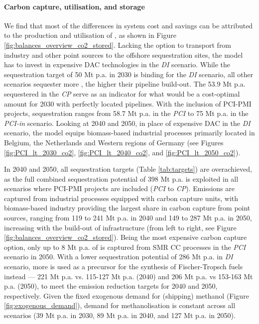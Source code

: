 \documentclass[preprint,12pt,sort&compress]{elsarticle}
\begin{document}
\paragraph{Carbon capture, utilisation, and storage}
\label{sec:ccus}
We find that most of the differences in system cost and savings can be attributed to the production and utilisation of , as shown in Figure \ref{fig:balances_overview_co2_stored}. Lacking the option to transport  from industry and other point sources to the offshore sequestration sites, the model has to invest in expensive DAC technologies in the \textit{DI} scenario. While the sequestration target of 50 Mt p.a. in 2030 is binding for the \textit{DI} scenario, all other scenarios sequester more , the higher their  pipeline build-out. The 53.9 Mt p.a.  sequestered in the \textit{CP} serve as an indicator for what would be a cost-optimal amount for 2030 with perfectly located pipelines. With the inclusion of PCI-PMI projects,  sequestration ranges from 58.7 Mt p.a. in the \textit{PCI} to 75 Mt p.a. in the \textit{PCI-in} scenario. 
Looking at 2040 and 2050, in place of expensive DAC in the \textit{DI} scenario, the model equips biomass-based industrial processes primarily located in Belgium, the Netherlands and Western regions of Germany (see Figures \ref{fig:PCI_lt_2030_co2}, \ref{fig:PCI_lt_2040_co2}, and \ref{fig:PCI_lt_2050_co2}). 

In 2040 and 2050, all sequestration targets (Table \ref{tab:targets}) are overachieved, as the full combined  sequestration potential of 398 Mt p.a. is exploited in all scenarios where PCI-PMI projects are included (\textit{PCI} to \textit{CP}). Emissions are captured from industrial processes equipped with carbon capture units, with biomass-based industry providing the largest share in carbon capture from point sources, ranging from 119 to 241 Mt p.a. in 2040 and 149 to 287 Mt p.a. in 2050, increasing with the build-out of  infrastructure (from left to right, see Figure \ref{fig:balances_overview_co2_stored}). Being the most expensive carbon capture option, only up to 8 Mt p.a. of  is captured from SMR CC processes in the \textit{PCI} scenario in 2050. 
With a lower sequestration potential of 286 Mt p.a. in \textit{DI} scenario, more  is used as a precursor for the synthesis of Fischer-Tropsch fuels instead --- 221 Mt p.a. vs. 115-127 Mt p.a. (2040) and 206 Mt p.a. vs 153-163 Mt p.a. (2050), to meet the emission reduction targets for 2040 and 2050, respectively. 
Given the fixed exogenous demand for (shipping) methanol (Figure \ref{fig:exogenous_demand}),  demand for methanolisation is constant across all scenarios (39 Mt p.a. in 2030, 89 Mt p.a. in 2040, and 127 Mt p.a. in 2050). 
\end{document}
